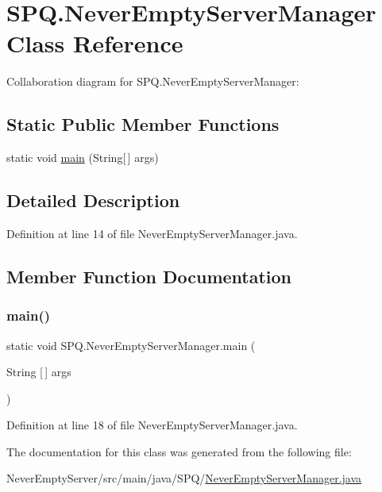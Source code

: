 \hypertarget{class_s_p_q_1_1_never_empty_server_manager}{}\section{S\+P\+Q.\+Never\+Empty\+Server\+Manager Class Reference}
\label{class_s_p_q_1_1_never_empty_server_manager}


Collaboration diagram for S\+P\+Q.\+Never\+Empty\+Server\+Manager\+:
\subsection*{Static Public Member Functions}
\begin{DoxyCompactItemize}
\item 
static void \mbox{\hyperlink{class_s_p_q_1_1_never_empty_server_manager_a999f5ecf0ed5f60f8661d0064420fdbd}{main}} (String\mbox{[}$\,$\mbox{]} args)
\end{DoxyCompactItemize}


\subsection{Detailed Description}


Definition at line 14 of file Never\+Empty\+Server\+Manager.\+java.



\subsection{Member Function Documentation}
\mbox{\label{class_s_p_q_1_1_never_empty_server_manager_a999f5ecf0ed5f60f8661d0064420fdbd}} 
\subsubsection{\texorpdfstring{main()}{main()}}
{\footnotesize\ttfamily static void S\+P\+Q.\+Never\+Empty\+Server\+Manager.\+main (\begin{DoxyParamCaption}\item[{String \mbox{[}$\,$\mbox{]}}]{args }\end{DoxyParamCaption})\hspace{0.3cm}{\ttfamily [static]}}



Definition at line 18 of file Never\+Empty\+Server\+Manager.\+java.



The documentation for this class was generated from the following file\+:\begin{DoxyCompactItemize}
\item 
Never\+Empty\+Server/src/main/java/\+S\+P\+Q/\mbox{\hyperlink{_never_empty_server_manager_8java}{Never\+Empty\+Server\+Manager.\+java}}\end{DoxyCompactItemize}

